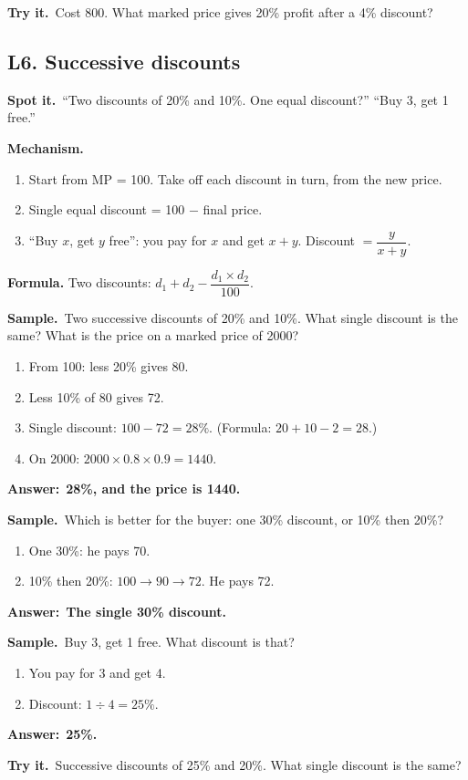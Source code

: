 \documentclass[11pt,a4paper]{article}
\let\oldsubsection\subsection
\renewcommand{\subsection}{\needspace{9\baselineskip}\oldsubsection}
\newcommand{\spot}{\textbf{\color{ember}Spot it.}\ }
\newcommand{\mech}{\textbf{\color{ember}Mechanism.}\ }
\newif\ifkeepsamp
\newcommand{\ans}[1]{\par\nopagebreak\noindent\textbf{\color{ember}Answer:}\ \textbf{#1}\par}
\newcommand{\samp}{\ifkeepsamp\needspace{4\baselineskip}\fi\textbf{\color{ember}Sample.}\ }
\newcommand{\tryit}[1]{\textbf{\color{ember}Try it.}\ #1}
\begin{document}
\tryit Cost 800. What marked price gives 20\% profit after a 4\% discount?

\subsection{L6. Successive discounts}
\spot ``Two discounts of 20\% and 10\%. One equal discount?'' ``Buy 3, get 1 free.''

\mech
\begin{enumerate}
\item Start from MP = 100. Take off each discount in turn, from the new price.
\item Single equal discount = 100 $-$ final price.
\item ``Buy $x$, get $y$ free'': you pay for $x$ and get $x + y$. Discount $= \dfrac{y}{x + y}$.
\end{enumerate}
\textbf{Formula.} Two discounts: $d_1 + d_2 - \dfrac{d_1 \times d_2}{100}$.

\samp Two successive discounts of 20\% and 10\%. What single discount is the same? What is the price on a marked price of 2000?
\begin{enumerate}
\item From 100: less 20\% gives 80.
\item Less 10\% of 80 gives 72.
\item Single discount: $100 - 72 = 28\%$. (Formula: $20 + 10 - 2 = 28$.)
\item On 2000: $2000 \times 0.8 \times 0.9 = 1440$.
\end{enumerate}
\ans{28\%, and the price is 1440.}

\samp Which is better for the buyer: one 30\% discount, or 10\% then 20\%?
\begin{enumerate}
\item One 30\%: he pays 70.
\item 10\% then 20\%: $100 \to 90 \to 72$. He pays 72.
\end{enumerate}
\ans{The single 30\% discount.}

\samp Buy 3, get 1 free. What discount is that?
\begin{enumerate}
\item You pay for 3 and get 4.
\item Discount: $1 \div 4 = 25\%$.
\end{enumerate}
\ans{25\%.}

\tryit Successive discounts of 25\% and 20\%. What single discount is the same?
\end{document}
